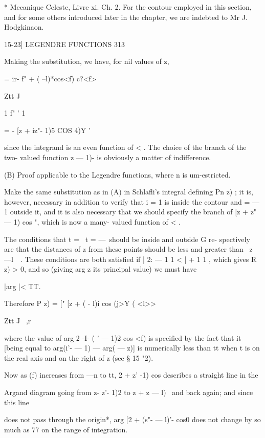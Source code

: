 {{* Mecanique Celeste, Livre xi. Ch. 2. For the contour employed in this section, and for 
some others introduced later in the chapter, we are indebted to Mr J. Hodgkinaon. 



15-23] LEGENDRE FUNCTIONS 313 

Making the substitution, we have, for nil values of z, 



= ir- f"    + ( --l)*cos<f)  c?<f> 

Ztt J \   

1 f" ' 1 

= - [z + iz"- 1)5 COS 4)Y  ' 



since the integrand is an even function of < . The choice of the branch of 
the two- valued function  z  — 1)- is obviously a matter of indifference. 

(B) Proof applicable to the Legendre functions, where n is um-estricted. 

Make the same substitution as in (A) in Schlafli's integral defining 
Pn  z) ; it is, however, necessary in addition to verify that i = 1 is inside the 
contour and   = — 1 outside it, and it is also necessary that we should specify 
the branch of [z +  z"  — 1)  cos   ", which is now a many- valued function of < . 

The conditions that t = \, t = —\ should be inside and outside G re- 
spectively are that the distances of z from these points should be less and 
greater than \ z —l\ \  . These conditions are both satisfied if | 2: — 1 1 < |   + 1 1 , 
which gives R  z) > 0, and so (giving arg z its principal value) we must have 

|arg |<  TT. 

Therefore P   z) =   [" [z + (  - l)i cos (j>Y ( <l>> 

Ztt J \ ,r 

where the value of arg  2  -I- ( '  — 1)2 cos <f)  is specified by the fact that it 
[being equal to arg(i'- — 1) — arg( — z)] is numerically less than tt when t is 
on the real axis and on the right of z (see § 15 "2). 

Now as (f) increases from —n to tt, 2 +  z' -1)  cos describes a straight line in the 

Argand diagram going from z- z'- 1)2 to z +  z  — l)~ and back again; and since this line 

does not pass through the origin*, arg [2 + (s"- — l)'-  cos0  does not change by so much as 
77 on the range of integration. 

}}
